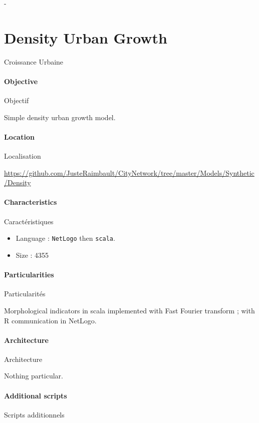 -





\section{Density Urban Growth}{Croissance Urbaine}

\paragraph{Objective}{Objectif}

Simple density urban growth model.

\paragraph{Location}{Localisation}

\url{https://github.com/JusteRaimbault/CityNetwork/tree/master/Models/Synthetic/Density}

\paragraph{Characteristics}{Caractéristiques}

\begin{itemize}
\item Language : \texttt{NetLogo} then \texttt{scala}.
\item Size : 4355
\end{itemize}


\paragraph{Particularities}{Particularités}

Morphological indicators in scala implemented with Fast Fourier transform ; with R communication in NetLogo.

\paragraph{Architecture}{Architecture}

Nothing particular.

\paragraph{Additional scripts}{Scripts additionnels}

